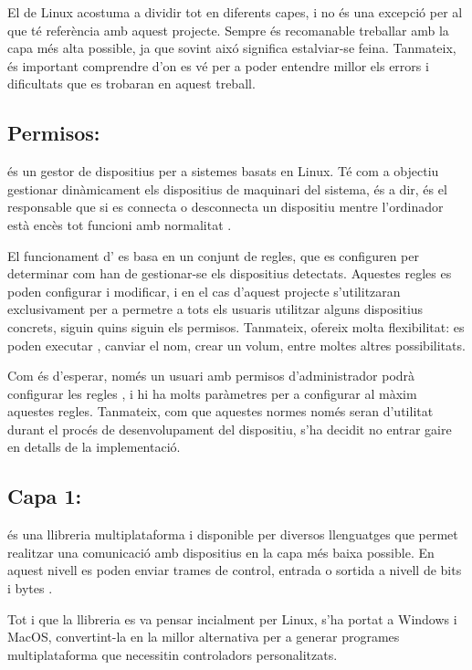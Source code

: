 El  de Linux acostuma a dividir tot en diferents capes, i no és una
excepció per al que té referència amb aquest projecte. Sempre és recomanable
treballar amb la capa més alta possible, ja que sovint aixó significa
estalviar-se feina. Tanmateix, és important comprendre d'on es vé per a
poder entendre millor els errors i dificultats que es trobaran en aquest treball.

\subsection{Permisos: }

 és un gestor de dispositius per a sistemes basats en Linux.
Té com a objectiu gestionar dinàmicament els dispositius de maquinari del
sistema, és a dir, és el responsable que si es connecta o desconnecta
un dispositiu mentre l'ordinador està encès tot funcioni amb normalitat \cite{Udev}.

El funcionament d' es basa en un conjunt de regles,
que es configuren per
determinar com han de gestionar-se els dispositius detectats.
Aquestes regles es poden configurar i modificar, i en el cas d'aquest projecte
s'utilitzaran exclusivament per a permetre a tots els usuaris utilitzar alguns
dispositius concrets, siguin quins siguin els permisos. Tanmateix, 
ofereix molta flexibilitat: es poden executar , canviar el nom,
crear un volum, entre moltes altres possibilitats.

Com és d'esperar, només un usuari amb permisos d'administrador podrà configurar
les regles , i hi ha molts paràmetres per a configurar al màxim
aquestes regles. Tanmateix, com que aquestes normes només seran d'utilitat durant
el procés de desenvolupament del dispositiu, s'ha decidit no entrar gaire en
detalls de la implementació.

\subsection{Capa 1: }

 és una llibreria multiplataforma i disponible per diversos
llenguatges que permet realitzar una comunicació amb dispositius  en
la capa més baixa possible. En aquest nivell es poden enviar trames de control,
entrada o sortida a nivell de bits i bytes \cite{Libusb}.

Tot i que la llibreria es va pensar
incialment per Linux, s'ha portat a Windows i MacOS, convertint-la en la millor
alternativa per a generar programes multiplataforma que necessitin controladors
personalitzats.

